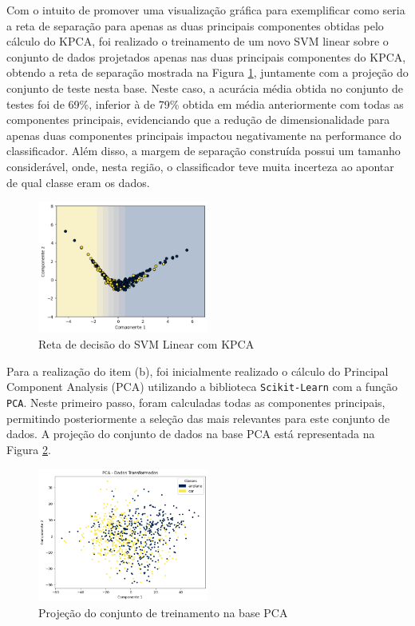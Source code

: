 \documentclass[]{abntex2}
\begin{document}
Com o intuito de promover uma visualização gráfica para exemplificar como seria a reta de separação para apenas as duas principais componentes obtidas pelo cálculo do KPCA, foi realizado o treinamento de um novo SVM linear sobre o conjunto de dados projetados apenas nas duas principais componentes do KPCA, obtendo a reta de separação mostrada na Figura \ref{fig:kpca_reta}, juntamente com a projeção do conjunto de teste nesta base. Neste caso, a acurácia média obtida no conjunto de testes foi de 69\%, inferior à de 79\% obtida em média anteriormente com todas as componentes principais, evidenciando que a redução de dimensionalidade para apenas duas componentes principais impactou negativamente na performance do classificador. Além disso, a margem de separação construída possui um tamanho considerável, onde, nesta região, o classificador teve muita incerteza ao apontar de qual classe eram os dados.

\begin{figure}[H]
    \centering 
    \includegraphics[width=0.5\textwidth]{imgs/ex1/kpca_reta.png}
    \caption{Reta de decisão do SVM Linear com KPCA}
    \label{fig:kpca_reta} %
\end{figure}

\newpage

Para a realização do item (b), foi inicialmente realizado o cálculo do Principal Component Analysis (PCA) utilizando a biblioteca \texttt{Scikit-Learn} com a função \texttt{PCA}. Neste primeiro passo, foram calculadas todas as componentes principais, permitindo posteriormente a seleção das mais relevantes para este conjunto de dados. A projeção do conjunto de dados na base PCA está representada na Figura \ref{fig:PCA}.

\begin{figure}[H]
    \centering 
    \includegraphics[width=0.5\textwidth]{imgs/ex1/PCA.png}
    \caption{Projeção do conjunto de treinamento na base PCA}
    \label{fig:PCA} %
\end{figure}
\end{document}
